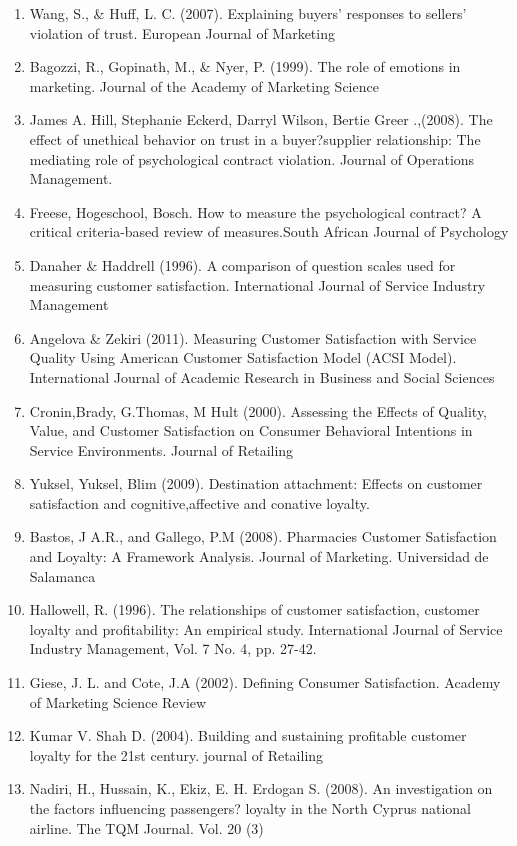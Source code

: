 \documentclass[a4paper, 14pt]{extarticle}
\begin{document}
{\begin{enumerate}
\item Wang, S., \& Huff, L. C. (2007). Explaining buyers' responses to sellers' violation of trust. European Journal of Marketing%
\item Bagozzi, R., Gopinath, M., \& Nyer, P. (1999). The role of emotions in marketing. Journal of the Academy of Marketing Science%
\item James A. Hill, Stephanie Eckerd, Darryl Wilson, Bertie Greer .,(2008). The effect of unethical behavior on trust in a buyer?supplier relationship: The mediating role of psychological contract violation. Journal of Operations Management.%
\item Freese, Hogeschool, Bosch. How to measure the psychological contract? A critical criteria-based review of measures.South African Journal of Psychology
\item Danaher \& Haddrell (1996). A comparison of question scales used for measuring customer satisfaction. International Journal of Service Industry Management
\item  Angelova \& Zekiri (2011). Measuring Customer Satisfaction with Service Quality Using American Customer Satisfaction Model (ACSI Model). International Journal of Academic Research in Business and Social Sciences 
\item Cronin,Brady, G.Thomas, M Hult (2000). Assessing the Effects of Quality, Value, and Customer Satisfaction on Consumer Behavioral Intentions in Service Environments. Journal of Retailing 
\item Yuksel, Yuksel, Blim (2009). Destination attachment: Effects on customer satisfaction and cognitive,affective and conative loyalty.
\item Bastos, J A.R., and Gallego, P.M (2008). Pharmacies Customer Satisfaction and Loyalty: A Framework Analysis. Journal of Marketing. Universidad de Salamanca
\item Hallowell, R. (1996). The relationships of customer satisfaction, customer loyalty and profitability: An empirical study. International Journal of Service Industry Management, Vol. 7 No. 4, pp. 27-42.
\item Giese, J. L. and Cote, J.A (2002). Defining Consumer Satisfaction. Academy of Marketing Science Review
\item Kumar V. Shah D. (2004). Building and sustaining profitable customer loyalty for the 21st century. journal of Retailing
\item Nadiri, H., Hussain, K., Ekiz, E. H. Erdogan S. (2008). An investigation on the factors influencing passengers? loyalty in the North Cyprus national airline. The TQM Journal. Vol. 20 (3)

\end{enumerate}
}
\end{document}
